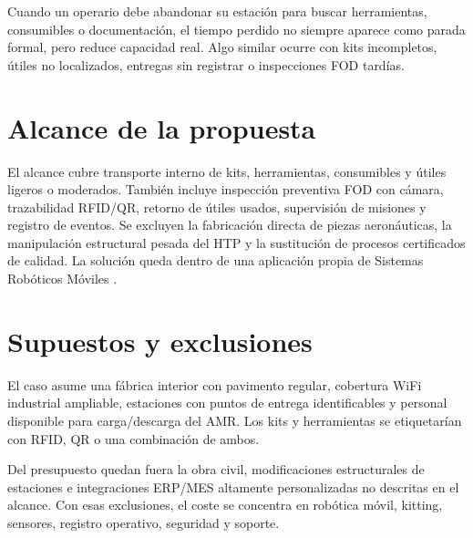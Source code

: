 Cuando un operario debe abandonar su estación para buscar herramientas, consumibles o documentación, el tiempo perdido no siempre aparece como parada formal, pero reduce capacidad real. Algo similar ocurre con kits incompletos, útiles no localizados, entregas sin registrar o inspecciones FOD tardías.


\section{Alcance de la propuesta}

El alcance cubre transporte interno de kits, herramientas, consumibles y útiles ligeros o moderados. También incluye inspección preventiva FOD con cámara, trazabilidad RFID/QR, retorno de útiles usados, supervisión de misiones y registro de eventos. Se excluyen la fabricación directa de piezas aeronáuticas, la manipulación estructural pesada del HTP y la sustitución de procesos certificados de calidad. La solución queda dentro de una aplicación propia de Sistemas Robóticos Móviles \cite{siegwart2011,tzafestas2014,ollero2001}.

\section{Supuestos y exclusiones}

El caso asume una fábrica interior con pavimento regular, cobertura WiFi industrial ampliable, estaciones con puntos de entrega identificables y personal disponible para carga/descarga del AMR. Los kits y herramientas se etiquetarían con RFID, QR o una combinación de ambos.

Del presupuesto quedan fuera la obra civil, modificaciones estructurales de estaciones e integraciones ERP/MES altamente personalizadas no descritas en el alcance. Con esas exclusiones, el coste se concentra en robótica móvil, kitting, sensores, registro operativo, seguridad y soporte.
